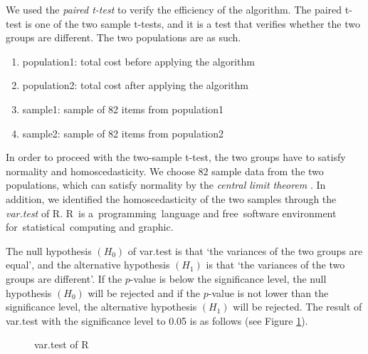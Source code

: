 \documentclass[a4paper]{amsart}
\numberwithin{equation}{section} %
\numberwithin{figure}{section} %
\numberwithin{table}{section}
\theoremstyle{plain}
\theoremstyle{definition}
\theoremstyle{plain}
\theoremstyle{plain}
\theoremstyle{plain}
\theoremstyle{plain}
\theoremstyle{plain}
\begin{document}
We used the {\it paired t-test}\cite{Rice} to verify the efficiency of the algorithm. 
The paired t-test is one of the two sample t-tests, and it is a test that verifies whether the two groups are different. The two populations are as such.

\begin{enumerate}[$\bullet$]
	\item population1: total cost before applying the algorithm
	\item population2: total cost after applying the algorithm
	\item sample1: sample of 82 items from population1
	\item sample2: sample of 82 items from population2
\end{enumerate}

In order to proceed with the two-sample t-test, the two groups have to satisfy normality and homoscedasticity. We choose $82$ sample data from the two populations, which can satisfy normality by the {\it central limit theorem} \cite{Durrett}.
In addition, we identified the homoscedasticity of the two samples through the {\it var.test} of R. 
R is a programming language and free software environment for statistical computing and graphic. %



The null hypothesis $(H_{0})$ of var.test is that `the variances of the two groups are equal', and the alternative hypothesis $(H_{1})$ is that `the variances of the two groups are different'. 
If the $p$-value is below the significance level, the null hypothesis $(H_{0})$ will be rejected and if the $p$-value is not lower than the significance level, the alternative hypothesis $(H_{1})$ will be rejected.  The result of var.test with the significance level to 0.05 is as follows (see Figure \ref{fig:vartest}).

\begin{figure}[h!]
	\centering
	\caption{var.test of R}
	\label{fig:vartest}       %
\end{figure}
\end{document}
